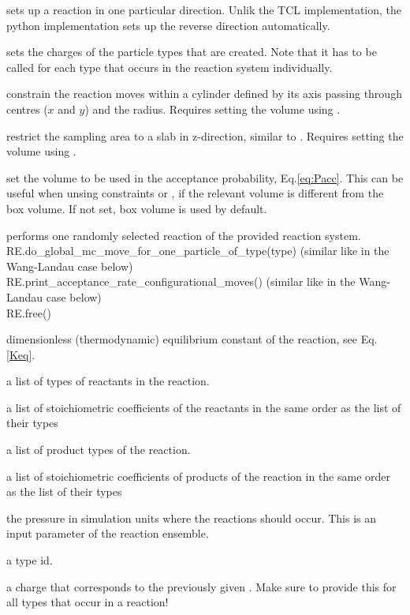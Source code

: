  sets up a reaction in one particular direction. Unlik the TCL
implementation, the python implementation sets up the reverse direction
automatically.

 sets the charges of the particle types that are created. Note that
it has to be called for each type that occurs in the reaction system
individually.

 constrain the reaction moves within a cylinder defined by its axis passing through centres ($x$ and $y$) and the radius. 
Requires setting the volume using .

 restrict the sampling area to a slab in z-direction, similar to .
Requires setting the volume using .

 set the volume to be used in the acceptance probability,
Eq.\ref{eq:Pacc}. This can be useful when unsing constraints  or
, if the relevant volume is different from the box volume. If not
set, box volume is used by default.

 performs one randomly selected reaction of the provided reaction system.
	  RE.do_global_mc_move_for_one_particle_of_type(type) (similar like in the Wang-Landau case below) \\
	 RE.print_acceptance_rate_configurational_moves() (similar like in the Wang-Landau case below) \\
	 RE.free() 

  \begin{arguments}
  \item[\var{K}] dimensionless (thermodynamic) equilibrium constant of the reaction, see Eq.\ref{Keq}. 
\item[\var{list\_educt\_types}] a list of types of reactants in the reaction.
\item[\var{list\_educt\_coefficients}] a list of stoichiometric coefficients of the reactants 
	in the same order as the list of their types
\item[\var{list\_product\_types}] a list of product types of the reaction.
\item[\var{list\_product\_coefficients}] a list of stoichiometric coefficients of products of the reaction
	in the same order as the list of their types
\item[\var{desired\_pressure\_at\_which\_reactions\_occur}] the pressure in simulation units where the reactions should occur. This is an input parameter of the reaction ensemble.
\item[\var{type}] a type id.
\item[\var{charge}] a charge that corresponds to the previously given . Make sure to provide this for all types that occur in a reaction!
  \end{arguments}



